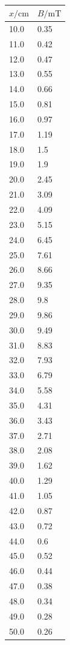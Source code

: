 \documentclass[11pt,ngerman,a4paper]{article}
\begin{document}
\begin{table}
\centering
\begin{tabular}{ll}
\toprule
{$x / \si{\centi\meter}$} &{ $B/\si{\milli\tesla}$ }\\
\midrule
10.0 & 0.35\\
11.0 & 0.42\\
12.0 & 0.47\\
13.0 & 0.55\\
14.0 & 0.66\\
15.0 & 0.81\\
16.0 & 0.97\\
17.0 & 1.19\\
18.0 & 1.5\\
19.0 & 1.9\\
20.0 & 2.45\\
21.0 & 3.09\\
22.0 & 4.09\\
23.0 & 5.15\\
24.0 & 6.45\\
25.0 & 7.61\\
26.0 & 8.66\\
27.0 & 9.35\\
28.0 & 9.8\\
29.0 & 9.86\\
30.0 & 9.49\\
31.0 & 8.83\\
32.0 & 7.93\\
33.0 & 6.79\\
34.0 & 5.58\\
35.0 & 4.31\\
36.0 & 3.43\\
37.0 & 2.71\\
38.0 & 2.08\\
39.0 & 1.62\\
40.0 & 1.29\\
41.0 & 1.05\\
42.0 & 0.87\\
43.0 & 0.72\\
44.0 & 0.6\\
45.0 & 0.52\\
46.0 & 0.44\\
47.0 & 0.38\\
48.0 & 0.34\\
49.0 & 0.28\\
50.0 & 0.26\\
\bottomrule
\end{tabular}
\label{}
\caption{}
\end{table}
\end{document}
